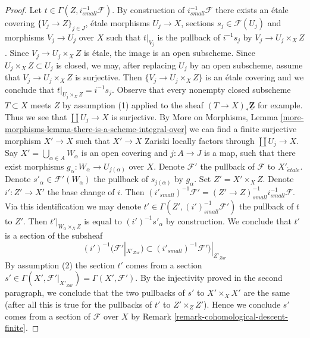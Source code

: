 \documentclass[10pt,a4paper]{amsart}
\theoremstyle{plain}
\theoremstyle{definition}
\theoremstyle{remark}
\numberwithin{equation}{subsection}
\def\etale{{\acute{e}tale}}
\begin{document}
\begin{proof}
\medskip\noindent
Let $t \in \Gamma(Z, i^{-1}_{small}\mathcal{F})$. By construction of
$i^{-1}_{small}\mathcal{F}$ there exists an \'etale covering
$\{V_j \to Z\}_{j \in J}$, \'etale morphisms $U_j \to X$, sections
$s_j \in \mathcal{F}(U_j)$ and morphisms $V_j \to U_j$ over $X$
such that $t|_{V_j}$ is the pullback of $i^{-1}s_j$ by
$V_j \to U_j \times_X Z$. Since $V_j \to U_j \times_X Z$ is \'etale,
the image is an open subscheme. Since $U_j \times_X Z \subset U_j$ is
closed, we may, after replacing $U_j$ by an open subscheme, assume
that $V_j \to U_j \times_X Z$ is surjective. Then $\{V_j \to U_j \times_X Z\}$
is an \'etale covering and we conclude that $t|_{U_j \times_X Z} = i^{-1}s_j$.
Observe that every nonempty closed subscheme $T \subset X$ meets $Z$
by assumption (1) applied to the sheaf $(T \to X)_*\underline{\mathbf{Z}}$
for example. Thus we see that $\coprod U_j \to X$ is surjective.
By More on Morphisms, Lemma
\ref{more-morphisms-lemma-there-is-a-scheme-integral-over}
we can find a finite surjective morphism $X' \to X$
such that $X' \to X$ Zariski locally factors through $\coprod U_j \to X$.
Say $X' = \bigcup_{\alpha \in A} W_\alpha$ is an open covering
and $j : A \to J$ is a map, such that there exist morphisms
$g_\alpha : W_\alpha \to U_{j(\alpha)}$ over $X$. Denote
$\mathcal{F}'$ the pullback of $\mathcal{F}$ to $X'_\etale$.
Denote $s'_\alpha \in \mathcal{F}'(W_\alpha)$ the pullback
of $s_{j(\alpha)}$ by $g_\alpha$.
Set $Z' = X' \times_X Z$. Denote $i' : Z' \to X'$
the base change of $i$. Then $(i'_{small})^{-1}\mathcal{F}' =
(Z' \to Z)_{small}^{-1}i_{small}^{-1}\mathcal{F}$. Via this identification
we may denote $t' \in
\Gamma(Z', (i')^{-1}_{small}\mathcal{F}')$
the pullback of $t$ to $Z'$.
Then $t'|_{W_\alpha \times_X Z}$ is equal to $(i')^{-1}s'_\alpha$ by
construction. We conclude that $t'$ is a section of
the subsheaf
$$
(i')^{-1}(\mathcal{F}'|_{X'_{Zar}})
\subset
(i'_{small})^{-1}\mathcal{F}')|_{Z'_{Zar}}
$$
By assumption (2) the section $t'$ comes from a section
$s' \in \Gamma(X', \mathcal{F}'|_{X'_{Zar}}) = \Gamma(X', \mathcal{F}')$.
By the injectivity proved in the second paragraph,
we conclude that the two pullbacks of $s'$ to
$X' \times_X X'$ are the same (after all this is true for
the pullbacks of $t'$ to $Z' \times_Z Z'$). Hence we conclude
$s'$ comes from a section of $\mathcal{F}$ over $X$ by
Remark \ref{remark-cohomological-descent-finite}.
\end{proof}
\end{document}
